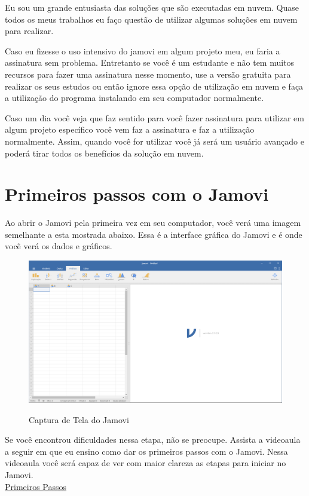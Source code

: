 Eu sou um grande entusiasta das soluções que são executadas em nuvem. Quase todos os meus trabalhos eu faço questão de utilizar algumas soluções em nuvem para realizar.

Caso eu fizesse o uso intensivo do jamovi em algum projeto meu, eu faria a assinatura sem problema. Entretanto se você é um estudante e não tem muitos recursos para fazer uma assinatura nesse momento, use a versão gratuita para realizar os seus estudos ou então ignore essa opção de utilização em nuvem e faça a utilização do programa instalando em seu computador normalmente.

Caso um dia você veja que faz sentido para você fazer assinatura para utilizar em algum projeto específico você vem faz a assinatura e faz a utilização normalmente. Assim, quando você for utilizar você já será um usuário avançado e poderá tirar todos os benefícios da solução em nuvem.

\section{Primeiros passos com o Jamovi}

Ao abrir o Jamovi pela primeira vez em seu computador, você verá uma imagem semelhante a esta mostrada abaixo. Essa é a interface gráfica do Jamovi e é onde você verá os dados e gráficos.

\begin{figure}[H]
  \centering
  \caption{Captura de Tela do Jamovi}
  \includegraphics[width=\textwidth]{imagens/cap_1/captura_tela_jamovi.png}
  \label{fig:captura_tela_jamovi}
\end{figure}

\begin{tcolorbox}[colback=white,colframe=green,title= Dica de Conteúdo]
  Se você encontrou dificuldades nessa etapa, não se preocupe. Assista a videoaula a seguir em que eu ensino como dar os primeiros passos com o Jamovi. Nessa videoaula você será capaz de ver com maior clareza as etapas para iniciar no Jamovi.\\
  \faYoutube{} \href{https://www.youtube.com/watch?v=bV9hlHPLe5I&t=5s}{Primeiros Passos}
\end{tcolorbox}


